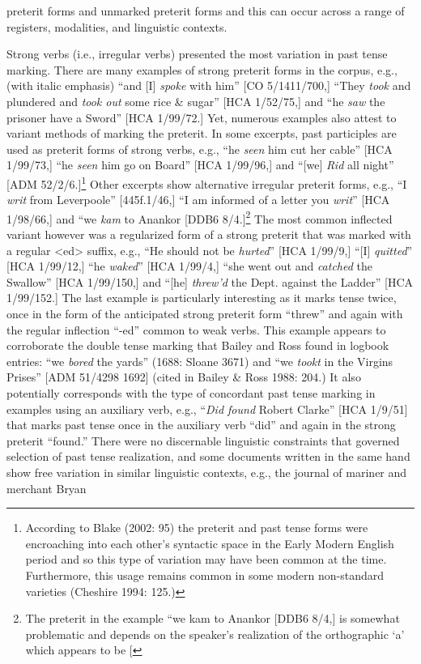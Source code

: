 \begin{styleStandard}
preterit forms and unmarked preterit forms and this can occur across a range of registers, modalities, and linguistic contexts. 
\end{styleStandard}


\begin{styleStandard}
Strong verbs (i.e., irregular verbs) presented the most variation in past tense marking. There are many examples of strong preterit forms in the corpus, e.g., (with italic emphasis) “and [I] \textit{spoke} with him” [CO 5/1411/700,] “They \textit{took} and plundered and \textit{took out} some rice \& sugar” [HCA 1/52/75,] and “he \textit{saw} the prisoner have a Sword” [HCA 1/99/72.] Yet, numerous examples also attest to variant methods of marking the preterit. In some excerpts, past participles are used as preterit forms of strong verbs, e.g., “he \textit{seen} him cut her cable” [HCA 1/99/73,] “he \textit{seen} him go on Board” [HCA 1/99/96,] and “[we]\textit{ Rid} all night” [ADM 52/2/6.]\footnote{ According to Blake (2002: 95) the preterit and past tense forms were encroaching into each other’s syntactic space in the Early Modern English period and so this type of variation may have been common at the time. Furthermore, this usage remains common in some modern non-standard varieties (Cheshire 1994: 125.)} Other excerpts show alternative irregular preterit forms, e.g., “I \textit{writ} from\textit{ }Leverpoole” [445f.1/46,] “I am informed of a letter you \textit{writ}” [HCA 1/98/66,] and “we \textit{kam} to Anankor{\textquotedbl} [DDB6 8/4.]\footnote{ The preterit in the example “we kam to Anankor{\textquotedbl} [DDB6 8/4,] is somewhat problematic and depends on the speaker’s realization of the orthographic ‘a’ which appears to be [\textcyrillic{ӕ] but could just have likely been realized as the diphthong [a\textlatin{[26A?]}] or another allophonic variant acceptable in contemporary usage. }} The most common inflected variant however was a regularized form of a strong preterit that was marked with a regular {\textless}ed{\textgreater} suffix, e.g., “He should not be \textit{hurted}” [HCA 1/99/9,] “[I] \textit{quitted}” [HCA 1/99/12,] “he \textit{waked}” [HCA 1/99/4,] “she went out and\textit{ catched} the Swallow” [HCA 1/99/150,] and “[he] \textit{threw’d} the Dept. against the Ladder” [HCA 1/99/152.] The last example is particularly interesting as it marks tense twice, once in the form of the anticipated strong preterit form “threw” and again with the regular inflection “-ed” common to weak verbs. This example appears to corroborate the double tense marking that Bailey and Ross found in logbook entries: “we \textit{bored} the yards” (1688: Sloane 3671) and “we \textit{tookt} in the Virgins Prises” [ADM 51/4298 1692] (cited in Bailey \& Ross 1988: 204.) It also potentially corresponds with the type of concordant past tense marking in examples using an auxiliary verb, e.g., “\textit{Did found} Robert Clarke” [HCA 1/9/51] that marks past tense once in the auxiliary verb “did” and again in the strong preterit “found.” There were no discernable linguistic constraints that governed selection of past tense realization, and some documents written in the same hand show free variation in similar linguistic contexts, e.g., the journal of mariner and merchant Bryan 
\end{styleStandard}
